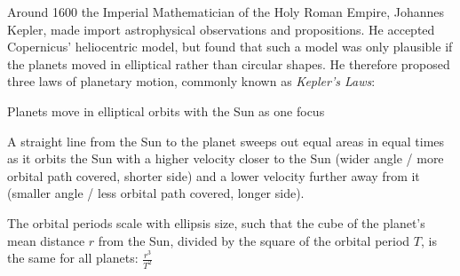 Around 1600 the Imperial Mathematician of the Holy Roman Empire, Johannes Kepler, made import astrophysical observations and propositions. He accepted Copernicus' heliocentric model, but found that such a model was only plausible if the planets moved in elliptical rather than circular shapes. He therefore proposed three laws of planetary motion, commonly known as \emph{Kepler's Laws}:

\begin{enumerate}

	Planets move in elliptical orbits with the Sun as one focus


	A straight line from the Sun to the planet sweeps out equal areas in equal times as it orbits the Sun with a higher velocity closer to the Sun (wider angle / more orbital path covered, shorter side) and a lower velocity further away from it (smaller angle / less orbital path covered, longer side).


	The orbital periods scale with ellipsis size, such that the cube of the planet's mean distance $r$ from the Sun, divided by the square of the orbital period $T$, is the same for all planets: $\frac{r^3}{T^2}$
\end{enumerate}


